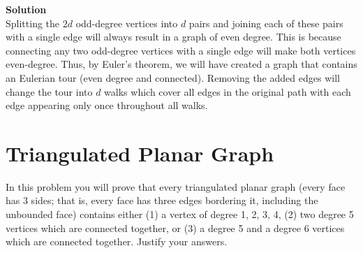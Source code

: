 \documentclass[11pt]{article}
\newcommand*{\Question}[1]{\section{#1}}
\newenvironment{Parts}{\begin{enumerate}[label=(\alph*)]}{\end{enumerate}}
\newenvironment{Answer}{\vspace{10pt}\begin{mdframed}\textbf{Solution}\\}{\end{mdframed}\vfill\pagebreak[3]}
\newenvironment{Answer}{\vspace{10pt}}{\vfill\pagebreak[3]}
\begin{document}
\begin{Parts}
\begin{Answer}
Splitting the $2d$ odd-degree vertices into $d$ pairs and joining each of these pairs with a single edge will always result in a graph of even degree. This is because connecting any two odd-degree vertices with a single edge will make both vertices even-degree. Thus, by Euler's theorem, we will have created a graph that contains an Eulerian tour (even degree and connected). Removing the added edges will change the tour into $d$ walks which cover all edges in the original path with each edge appearing only once throughout all walks.
\end{Answer}

\end{Parts}



\Question {Triangulated Planar Graph}
In this problem you will prove that every triangulated planar graph (every face has 3 sides; that is, every face has three edges bordering it, including the unbounded face)
contains either (1) a vertex of degree 1, 2, 3, 4, (2) two degree 5 vertices 
which are connected together, or (3) a degree 5 and a degree 6 vertices which are 
connected together. Justify your answers.
\end{document}
